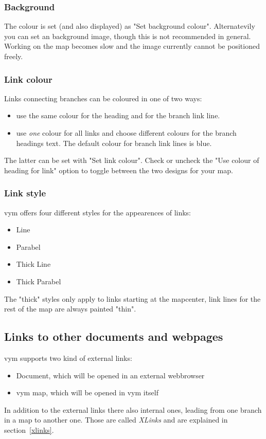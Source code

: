 \documentclass[12pt,a4paper]{article}
\newcommand{\vym}{{\sc vym }}
\begin{document}
\subsubsection*{Background }
The colour is set (and also displayed) as "Set background colour".
Alternatevily you can set an background image, though this is not
recommended in general. Working on the map becomes slow and the image
currently cannot be positioned freely.

\subsubsection*{Link colour}
Links connecting branches can be coloured in one of two ways:
\begin{itemize}
    \item use the same colour for the heading and for the branch link line.
    \item use {\em one} colour for all links and choose different colours for the branch headings text. The default colour for branch link lines is blue.
\end{itemize}
The latter can be set with "Set link colour". Check or uncheck the "Use
colour of heading for link" option to toggle between the two designs for
your map.

\subsubsection*{Link style}
\vym offers four different styles for the appearences of links:
\begin{itemize}
    \item Line
    \item Parabel
    \item Thick Line
    \item Thick Parabel
\end{itemize}
The "thick" styles only apply to links starting at the mapcenter, link lines for the rest
of the map are always painted "thin".


\subsection{Links to other documents and webpages}
\vym supports two kind of external links:
\begin{itemize}
    \item Document, which will be opened in an external webbrowser
    \item \vym map, which will be opened in \vym itself
\end{itemize}
In addition to the external links there also internal ones, leading from one
branch in a map to another one. Those are called {\em XLinks} and are explained
in section~\ref{xlinks}.
\end{document}
